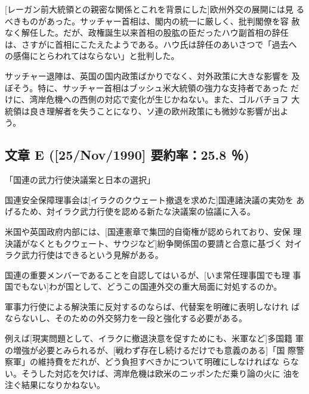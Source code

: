 [レーガン前大統領との親密な関係とこれを背景にした]欧州外交の展開には見
るべきものがあった。サッチャー首相は、閣内の統一に厳しく、批判閣僚を容
赦なく解任した。だが、政権誕生以来首相の股肱の臣だったハウ副首相の辞任
は、さすがに首相にこたえたようである。ハウ氏は辞任のあいさつで「過去へ
の感傷にとらわれてはならない」と批判した。

サッチャー退陣は、英国の国内政策ばかりでなく、対外政策に大きな影響を
及ぼそう。特に、サッチャー首相はブッシュ米大統領の強力な支持者であった
だけに、湾岸危機への西側の対応で変化が生じかねない。また、ゴルバチョフ
大統領は良き理解者を失うことになり、ソ連の欧州政策にも微妙な影響が出よ
う。


\subsection*{文章 E {\rm ([25/Nov/1990] 要約率：25.8 ％)}}
\centerline{\large 「国連の武力行使決議案と日本の選択」}

国連安全保障理事会は[イラクのクウェート撤退を求めた]国連諸決議の実効を
あげるため、対イラク武力行使を認める新たな決議案の協議に入る。

米国や英国政府内部には、[国連憲章で集団的自衛権が認められており、安保
理決議がなくともクウェート、サウジなど]紛争関係国の要請と合意に基づく
対イラク武力行使はできるという見解がある。

国連の重要メンバーであることを自認してはいるが、[いま常任理事国でも理
事国でもない]わが国として、どうこの国連外交の重大局面に対処するのか。

軍事力行使による解決策に反対するのならば、代替案を明確に表明しなけれ
ばならないし、そのための外交努力を一段と強化する必要がある。

例えば[現実問題として、イラクに撤退決意を促すためにも、米軍など]多国籍
軍の増強が必要とみられるが、[戦わず存在し続けるだけでも意義のある]「国
際警察軍」の維持費をだれが、どう負担すべきかについて明確にしなければな
らない。そうした対応を欠けば、湾岸危機は欧米のニッポンただ乗り論の火に
油を注ぐ結果になりかねない。


